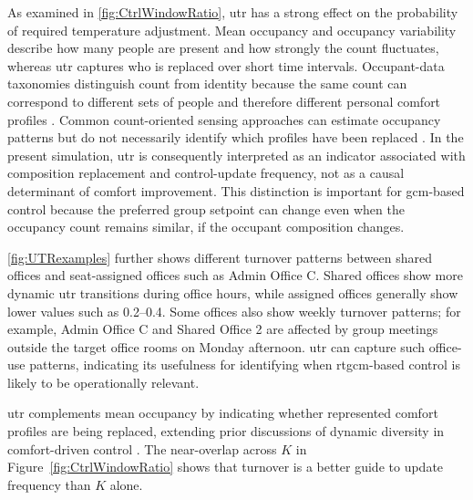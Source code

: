As examined in \autoref{fig:CtrlWindowRatio}, \ac{utr} has a strong effect on the probability of required temperature adjustment.
Mean occupancy and occupancy variability describe how many people are present and how strongly the count fluctuates, whereas \ac{utr} captures who is replaced over short time intervals.
Occupant-data taxonomies distinguish count from identity because the same count can correspond to different sets of people and therefore different personal comfort profiles \cite{nagy_ten_2023}.
Common count-oriented sensing approaches can estimate occupancy patterns but do not necessarily identify which profiles have been replaced \cite{wang_modeling_2017}.
In the present simulation, \ac{utr} is consequently interpreted as an indicator associated with composition replacement and control-update frequency, not as a causal determinant of comfort improvement.
This distinction is important for \ac{gcm}-based control because the preferred group setpoint can change even when the occupancy count remains similar, if the occupant composition changes.

\autoref{fig:UTRexamples} further shows different turnover patterns between shared offices and seat-assigned offices such as Admin Office C.
Shared offices show more dynamic \ac{utr} transitions during office hours, while assigned offices generally show lower values such as \qtyrange{0.2}{0.4}{}.
Some offices also show weekly turnover patterns; for example, Admin Office C and Shared Office 2 are affected by group meetings outside the target office rooms on Monday afternoon.
\ac{utr} can capture such office-use patterns, indicating its usefulness for identifying when \ac{rtgcm}-based control is likely to be operationally relevant.

\ac{utr} complements mean occupancy by indicating whether represented comfort profiles are being replaced, extending prior discussions of dynamic diversity in comfort-driven control \cite{jung_energy_2020}.
The near-overlap across $K$ in Figure~\ref{fig:CtrlWindowRatio} shows that turnover is a better guide to update frequency than $K$ alone.

